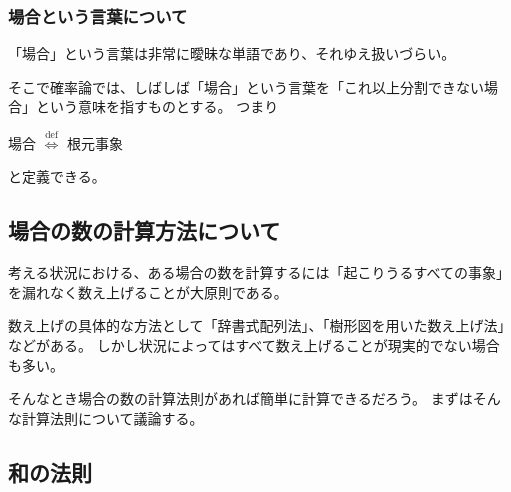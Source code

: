 \documentclass[a4j, 9pt]{ltjsarticle}
\def\defineProposition{\stackrel{\mathrm{def}}{\Longleftrightarrow}}
\def\ds{\displaystyle}
\begin{document}
      \subsubsection{場合という言葉について}
        「場合」という言葉は非常に曖昧な単語であり、それゆえ扱いづらい。\par
        そこで確率論では、しばしば「場合」という言葉を「これ以上分割できない場合」という意味を指すものとする。
        つまり

        \begin{center}
          場合 $\ds \defineProposition$ 根元事象
        \end{center}

        と定義できる。

    \subsection{場合の数の計算方法について}
      考える状況における、ある場合の数を計算するには「起こりうるすべての事象」を漏れなく数え上げることが大原則である。\par
      数え上げの具体的な方法として「辞書式配列法」、「樹形図を用いた数え上げ法」などがある。
      しかし状況によってはすべて数え上げることが現実的でない場合も多い。\par
      そんなとき場合の数の計算法則があれば簡単に計算できるだろう。
      まずはそんな計算法則について議論する。

    \subsection{和の法則}
\end{document}
